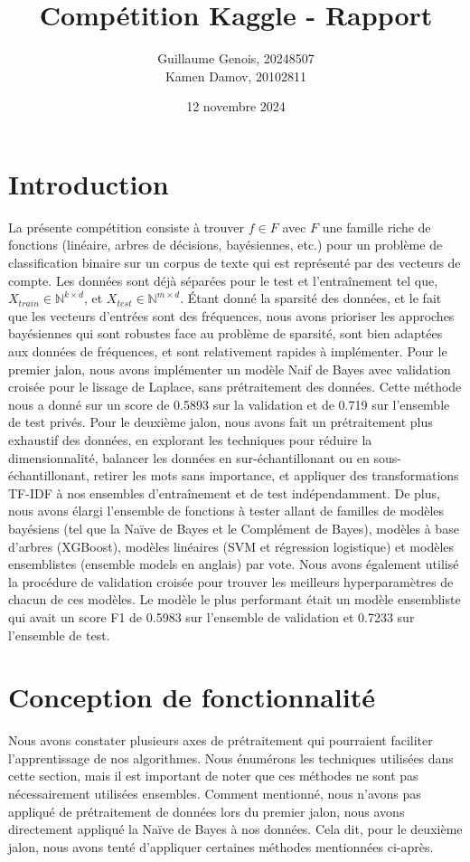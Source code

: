 \documentclass{article}
\title{Compétition Kaggle - Rapport}
\author{Guillaume Genois, 20248507 \\Kamen Damov, 20102811}
\date{12 novembre 2024}
\begin{document}
\maketitle
\section{Introduction}
La présente compétition consiste à trouver $f \in F$ avec $F$ une famille riche de fonctions (linéaire, arbres de décisions, bayésiennes, etc.) pour un problème de classification binaire sur un corpus de texte qui est représenté par des vecteurs de compte. Les données sont déjà séparées pour le test et l'entraînement tel que, $X_{train} \in \mathbb{N}^{k \times d}$, et $X_{test} \in \mathbb{N}^{m \times d}$. Étant donné la sparsité des données, et le fait que les vecteurs d'entrées sont des fréquences, nous avons prioriser les approches bayésiennes qui sont robustes face au problème de sparsité, sont bien adaptées aux données de fréquences, et sont relativement rapides à implémenter. Pour le premier jalon, nous avons implémenter un modèle Naif de Bayes avec validation croisée pour le lissage de Laplace, sans prétraitement des données. Cette méthode nous a donné sur un score de 0.5893 sur la validation et de 0.719  sur l'ensemble de test privés. Pour le deuxième jalon, nous avons fait un prétraitement plus exhaustif des données, en explorant les techniques pour réduire la dimensionnalité, balancer les données en sur-échantillonant ou en sous-échantillonant, retirer les mots sans importance, et appliquer des transformations TF-IDF à nos ensembles d'entraînement et de test indépendamment. De plus, nous avons élargi l'ensemble de fonctions à tester allant de familles de modèles bayésiens (tel que la Naïve de Bayes et le Complément de Bayes), modèles à base d'arbres (XGBoost), modèles linéaires (SVM et régression logistique) et modèles ensemblistes (ensemble models en anglais) par vote. Nous avons également utilisé la procédure de validation croisée pour trouver les meilleurs hyperparamètres de chacun de ces modèles. Le modèle le plus performant était un modèle ensembliste qui avait un score F1 de 0.5983 sur l'ensemble de validation et 0.7233 sur l'ensemble de test.

\section{Conception de fonctionnalité}
Nous avons constater plusieurs axes de prétraitement qui pourraient faciliter l'apprentissage de nos algorithmes. Nous énumérons les techniques utilisées dans cette section, mais il est important de noter que ces méthodes ne sont pas nécessairement utilisées ensembles. Comment mentionné, nous n'avons pas appliqué de prétraitement de données lors du premier jalon, nous avons directement appliqué la Naïve de Bayes à nos données. Cela dit, pour le deuxième jalon, nous avons tenté d'appliquer certaines méthodes mentionnées ci-après.
\end{document}

